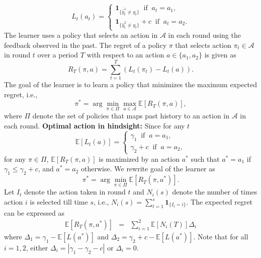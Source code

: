 \documentclass[draft, onecolumn, 12pt]{IEEEtran}
\begin{document}
\begin{equation}
L_t(a_t)=\begin{cases}
\boldsymbol{1}_{\{\hat{y}^1_t \neq y_t\}} \;\;\mbox{if}\;\;a_t=a_1,\\
\boldsymbol{1}_{\{\hat{y}^2_t\neq y_t\}}+c \;\;\mbox{if}\;\;a_t=a_2.
\end{cases}
\end{equation} 
The learner uses a policy that selects an action in  $\mathcal{A}$ in each round using the feedback observed in the past. The regret of a policy $\pi$ that selects action $\pi_t \in\mathcal{A}$ in round $t$ over a period $T$ with respect to an action $a \in \{a_1,a_2\}$ is given as 
\begin{equation}
R_T(\pi,a)= \sum_{t=1}^T (L_t(\pi_t)-L_t(a)).
\end{equation}
The goal of the learner is to learn a policy that minimizes the maximum expected regret, i.e.,
\begin{equation}
\pi^*= \arg \min_{\pi \in \Pi } \max_{a \in \mathcal{A}}\mathbb{E}[R_T(\pi,a)],
\end{equation}
where $\Pi$ denote the set of policies that maps past history to an action in $\mathcal{A}$ in each round. 
\noindent
{\bf Optimal action in hindsight: } Since for any $t$ 
\begin{equation}
\mathbb{E}[L_t(a)]=
\begin{cases}
\gamma_1\;\; \mbox{if}\;\; a=a_1,\\
\gamma_2+c\;\; \mbox{if}\;\;a=a_2,
\end{cases}
\end{equation}
for any $\pi \in \Pi$, $\mathbb{E}[R_T(\pi,a)]$ is maximized by an action $a^*$ such that $a^*=a_1$ if $\gamma_1 \leq \gamma_2 +c$, and $a^*=a_2$ otherwise. We rewrite goal of the learner as 
\begin{equation}
\label{eqn:Regret2Actions}
\pi^*= \arg \min_{\pi \in \Pi } \mathbb{E}[R_T(\pi,a^*)].
\end{equation}
\noindent
Let $I_t$ denote the action taken in round $t$ and $N_i(s)$ denote the number of times action $i$ is selected till time $s$, i.e., $N_i(s)=\sum_{t=1}^s \boldsymbol{1}_{\{I_t=i\}}$. The expected regret can be expressed as
\begin{eqnarray}
\label{eqn:ExpRegretGap}
\mathbb{E}[R_T(\pi,a^*)]&=& \sum_{i=1}^{2}\mathbb{E}[N_i(T)]\Delta_i 
\end{eqnarray}
where $\Delta_1=\gamma_1 -\mathbb{E}[L(a^*)]$ and $
\Delta_2=\gamma_2+c -\mathbb{E}[L(a^*)]$. Note that for all $i=1,2$, either $\Delta_i=|\gamma_1-\gamma_2-c|$ or $\Delta_i=0$.
\end{document}
